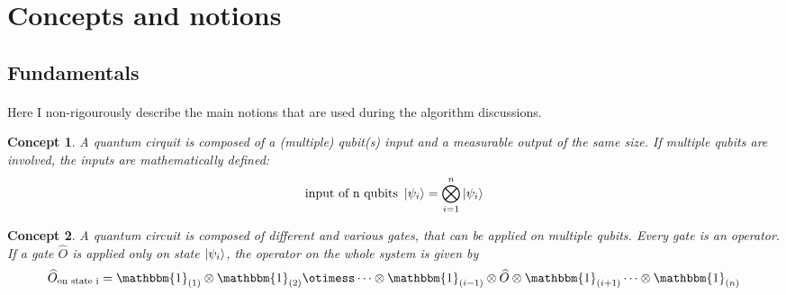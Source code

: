 \theoremstyle{concept}
\newtheorem{concept}{Concept}[section]




\section{Concepts and notions}

\subsection*{Fundamentals}
\paragraph{} Here I non-rigourously describe the main notions that are used during the algorithm discussions.
\begin{concept}
  A quantum cirquit is composed of a (multiple) qubit(s) input and a measurable output of the same size.
  If multiple qubits are involved, the inputs are mathematically defined: 
  \begin{gather}
    \text{input of n qubits }\ket{\psi_i} = \bigotimes_{i=1}^{n}\ket{\psi_i}
  \end{gather}
\end{concept}

\begin{concept}
  A quantum circuit is composed of different and various gates, that can be applied on multiple qubits. Every gate is an operator.
  If a gate $\widehat{O}$ is applied only on state $\ket{\psi_i}$, the operator on the whole system is given by 
  \begin{gather}
    \widehat{O}_{\text{on state i}} = \mathbbm{1}_{(1)}\otimes \mathbbm{1}_{(2)}\otimess \cdots \otimes \mathbbm{1}_{(i-1)}\otimes 
    \widehat{O}\otimes \mathbbm{1}_{(i+1)} \cdots \otimes \mathbbm{1}_{(n)}
  \end{gather}
\end{concept}
%
%
%

